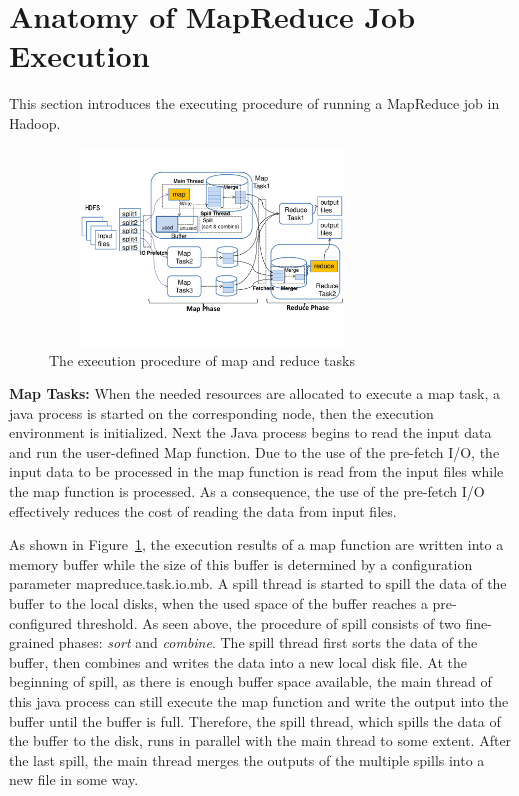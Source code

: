 \section{Anatomy of MapReduce Job Execution}
This section introduces the executing procedure of running a MapReduce job in Hadoop.
\begin{figure}[htbp]
\centering
\includegraphics[height=5.25cm, width=8.65cm]{Job}
\caption{The execution procedure of map and reduce tasks}
\label{fig:mrprocedure}
\end{figure}

\noindent\textbf{Map Tasks:}  When the needed resources are allocated to execute a map task, a java process is started on the corresponding node, then the execution environment is initialized. Next the Java process begins to read the input data and run the user-defined Map function. Due to the use of the pre-fetch I/O, the input data to be processed in the map function is read from the input files while the map function is processed. As a consequence, the use of the pre-fetch I/O effectively reduces the cost of reading the data from input files.

As shown in Figure~\ref{fig:mrprocedure}, the execution results of a map function are written into a memory buffer while the size of this buffer is determined by a configuration parameter mapreduce.task.io.mb. A spill thread is started to spill the data of the buffer to the local disks, when the used space of the buffer reaches a pre-configured threshold. As seen above, the procedure of spill consists of two fine-grained phases: \textit{sort} and \textit{combine}. The spill thread first sorts the data of the buffer, then combines and writes the data into a new local disk file. At the beginning of spill, as there is enough buffer space available, the main thread of this java process can still execute the map function and write the output into the buffer until the buffer is full. Therefore, the spill thread, which spills the data of the buffer to the disk, runs in parallel with the main thread to some extent. After the last spill, the main thread merges the outputs of the multiple spills into a new file in some way.

